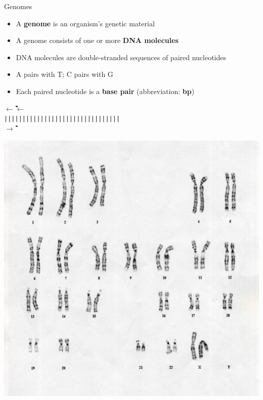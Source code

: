 \documentclass[xcolor=dvipsnames]{beamer}
\begin{document}
\begin{frame}{Genomes}
    \begin{minipage}{0.75\textwidth}
        \begin{itemize}
            \item A {\bf genome} is an organism's genetic material
            \item A genome consists of one or more {\bf DNA molecules}
            \item DNA molecules are double-stranded sequences of paired
                  nucleotides
            \item A pairs with T; C pairs with G
            \item Each paired nucleotide is a {\bf base pair} (abbreviation: {\bf bp})
        \end{itemize}
            \begin{center}
                {\tt {\bf $\leftarrow$}\G{}\T{}\T{}\G{}\C{}\T{}\A{}\T{}\A{}\A{}\A{}\T{}\A{}\C{}\G{}\G{}\G{}\T{}\C{}\A{}\T{}\G{}\G{}\T{}\A{}\T{}\T{}\T{}\A{}\C{}\C{}\G{}{\bf $\leftarrow$}} \\
                \vspace{-0.14cm}
                {\tt                     ||||||||||||||||||||||||||||||||} \\
                \vspace{-0.14cm}
                {\tt {\bf $\rightarrow$}\C{}\A{}\A{}\C{}\G{}\A{}\T{}\A{}\T{}\T{}\T{}\A{}\T{}\G{}\C{}\C{}\C{}\A{}\G{}\T{}\A{}\C{}\C{}\A{}\T{}\A{}\A{}\A{}\T{}\G{}\G{}\C{}{\bf $\rightarrow$}}
            \end{center}
    \end{minipage}
    \begin{minipage}{0.23\textwidth}
        \includegraphics[width=1.0\textwidth]{HumanKaryotype.jpg} \\

\end{minipage}
\end{frame}
\end{document}
